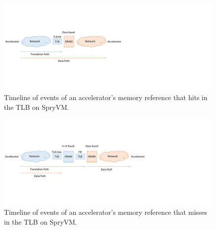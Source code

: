 \begin{figure}
	\includegraphics[width=\textwidth]{figures/time_event_partition_hit.pdf}
	\caption{Timeline of events of an accelerator's memory reference that hits in the TLB on SpryVM.}
	\label{fig:pagewalk_partition_hit}
\end{figure}

\begin{figure}
	\includegraphics[width=\textwidth]{figures/time_event_partition_miss.pdf}
	\caption{Timeline of events of an accelerator's memory reference that misses in the TLB on SpryVM.}
	\label{fig:pagewalk_partition_miss}
\end{figure}


 




